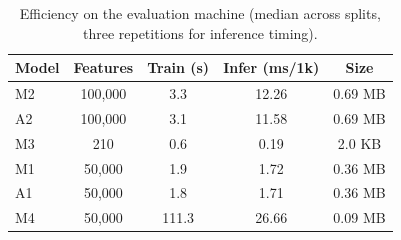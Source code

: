 
\begin{table}[!htbp]
\centering
\caption{Efficiency on the evaluation machine (median across splits, three repetitions for inference timing).}
\label{tab:efficiency}
\begin{tabular}{lcccc}
\hline\hline
Model & Features & Train (s) & Infer (ms/1k) & Size \\
\hline
M2 & 100,000 & 3.3 & 12.26 & 0.69 MB \\
A2 & 100,000 & 3.1 & 11.58 & 0.69 MB \\
M3 & 210 & 0.6 & 0.19 & 2.0 KB \\
M1 & 50,000 & 1.9 & 1.72 & 0.36 MB \\
A1 & 50,000 & 1.8 & 1.71 & 0.36 MB \\
M4 & 50,000 & 111.3 & 26.66 & 0.09 MB \\
\hline\hline
\end{tabular}
\end{table}
